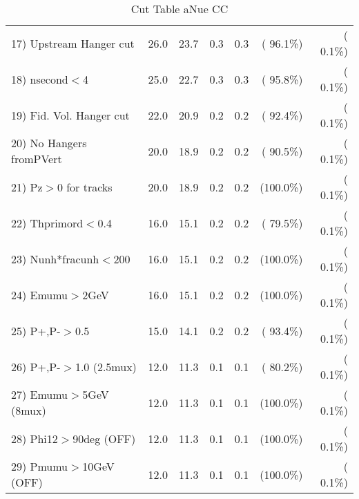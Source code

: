 \begin{table}[h!]
\begin{tabular}{||l||r|r|r|r|r|r||}
 17) Upstream Hanger cut  &         26.0 &         23.7 &          0.3 &          0.3 & ( 96.1\%) & (  0.1\%) \\
 18) nsecond$<$4          &         25.0 &         22.7 &          0.3 &          0.3 & ( 95.8\%) & (  0.1\%) \\
 19) Fid. Vol. Hanger cut &         22.0 &         20.9 &          0.2 &          0.2 & ( 92.4\%) & (  0.1\%) \\
 20) No Hangers fromPVert &         20.0 &         18.9 &          0.2 &          0.2 & ( 90.5\%) & (  0.1\%) \\
 21) Pz$>$0 for tracks    &         20.0 &         18.9 &          0.2 &          0.2 & (100.0\%) & (  0.1\%) \\
 22) Thprimord$<$0.4      &         16.0 &         15.1 &          0.2 &          0.2 & ( 79.5\%) & (  0.1\%) \\
 23) Nunh*fracunh$<$200   &         16.0 &         15.1 &          0.2 &          0.2 & (100.0\%) & (  0.1\%) \\
 24) Emumu$>$2GeV         &         16.0 &         15.1 &          0.2 &          0.2 & (100.0\%) & (  0.1\%) \\
 25) P+,P-$>$0.5          &         15.0 &         14.1 &          0.2 &          0.2 & ( 93.4\%) & (  0.1\%) \\
 26) P+,P-$>$1.0 (2.5mux) &         12.0 &         11.3 &          0.1 &          0.1 & ( 80.2\%) & (  0.1\%) \\
 27) Emumu$>$5GeV  (8mux) &         12.0 &         11.3 &          0.1 &          0.1 & (100.0\%) & (  0.1\%) \\
 28) Phi12$>$90deg  (OFF) &         12.0 &         11.3 &          0.1 &          0.1 & (100.0\%) & (  0.1\%) \\
 29) Pmumu$>$10GeV  (OFF) &         12.0 &         11.3 &          0.1 &          0.1 & (100.0\%) & (  0.1\%) \\
 \hline
 \hline
 \end{tabular}
 \caption{Cut Table  aNue CC  }
 \label{tab-cutcohjpsi-mumu_anuecc}
 \end{table}
